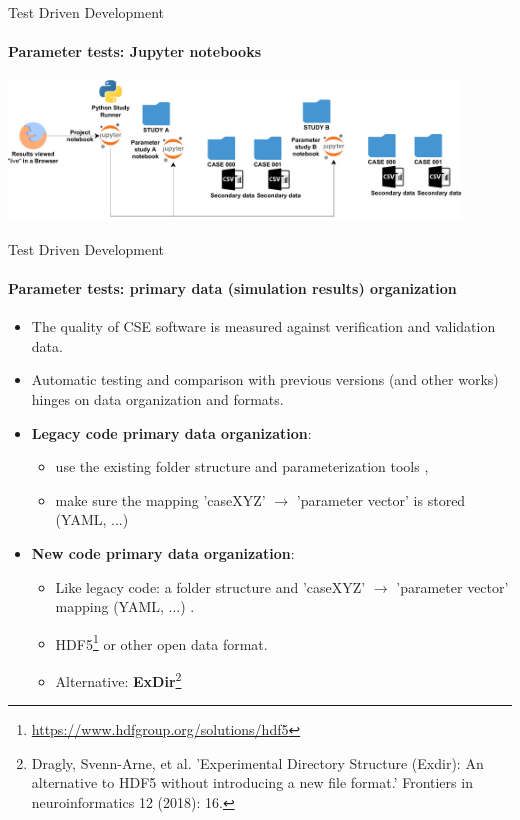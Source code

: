 \documentclass[
	ngerman,%
	aspectratio=169,%
	color={accentcolor=2d},
	logo=true,%
	colorframetitle=true,%
	]{tudabeamer}
\begin{document}
\begin{frame}{Test Driven Development} 
    \framesubtitle{Parameter tests: Jupyter notebooks}
    
    \vfill
    \begin{center}
            \includegraphics[width=0.9\textwidth]{figures/Cluster-Parameter-Study-Organization.pdf}
    \end{center}
\end{frame}

\begin{frame}{Test Driven Development} 
    \framesubtitle{Parameter tests: primary data (simulation results) organization}

    \begin{itemize}
        \item The quality of CSE software is measured against verification and validation data. 
        \item Automatic testing and comparison with previous versions (and other works) hinges on data organization and formats.
    \end{itemize}
    
    \vfill
    \begin{itemize}
        \item \textbf{Legacy code primary data organization}: 
            \begin{itemize}
                \item use the existing folder structure and parameterization tools \faGraduationCap,
                \item make sure the mapping 'caseXYZ' $\to$ 'parameter vector' is stored (YAML, ...)
            \end{itemize}
        \item \textbf{New code primary data organization}: 
            \begin{itemize}
                \item Like legacy code: a folder structure and 'caseXYZ' $\to$ 'parameter vector' mapping (YAML, ...) \faGraduationCap.
                \item HDF5\footnote{\url{https://www.hdfgroup.org/solutions/hdf5}} or other open data format.
                \item Alternative: \textbf{ExDir}\footnote{Dragly, Svenn-Arne, et al. 'Experimental Directory Structure (Exdir): An alternative to HDF5 without introducing a new file format.' Frontiers in neuroinformatics 12 (2018): 16.} 
            \end{itemize}
    \end{itemize}

\end{frame}
\end{document}
